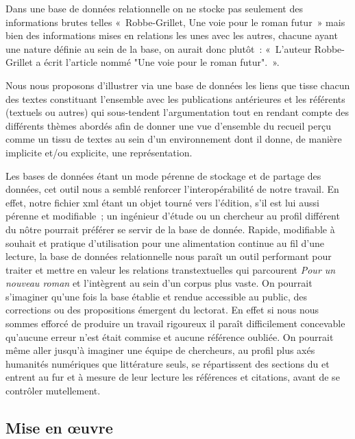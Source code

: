 \documentclass[12pt, a4paper]{article}
\begin{document}
    Dans une base de données relationnelle on ne stocke pas seulement des informations brutes telles «~Robbe-Grillet, Une voie pour le roman futur~» mais bien des informations mises en relations les unes avec les autres, chacune ayant une nature définie au sein de la base, on aurait donc plutôt~: «~L'auteur Robbe-Grillet a écrit l'article nommé "Une voie pour le roman futur".~».

    Nous nous proposons d'illustrer via une base de données les liens que tisse chacun des textes constituant l'ensemble avec les publications antérieures et les référents (textuels ou autres) qui sous-tendent l'argumentation tout en rendant compte des différents thèmes abordés afin de donner une vue d'ensemble du recueil perçu comme un tissu de textes au sein d'un environnement dont il donne, de manière implicite et/ou explicite, une représentation.

    Les bases de données étant un mode pérenne de stockage et de partage des données, cet outil nous a semblé renforcer l'interopérabilité de notre travail. En effet, notre fichier xml étant un objet tourné vers l'édition, s'il est lui aussi pérenne et modifiable~; un ingénieur d'étude ou un chercheur au profil différent du nôtre pourrait préférer se servir de la base de donnée. Rapide, modifiable à souhait et pratique d'utilisation pour une alimentation continue au fil d'une lecture, la base de données relationnelle nous paraît un outil performant pour traiter et mettre en valeur les relations transtextuelles qui parcourent \textit{Pour un nouveau roman} et l'intègrent au sein d'un corpus plus vaste. On pourrait s'imaginer qu'une fois la base établie et rendue accessible au public, des corrections ou des propositions émergent du lectorat. En effet si nous nous sommes efforcé de produire un travail rigoureux il paraît difficilement concevable qu'aucune erreur n'est était commise et aucune référence oubliée. On pourrait même aller jusqu'à imaginer une équipe de chercheurs, au profil plus axés humanités numériques que littérature seuls, se répartissent des sections du \punr{} et entrent au fur et à mesure de leur lecture les références et citations, avant de se contrôler mutellement. 


   




    \subsection{Mise en œuvre}
\end{document}
